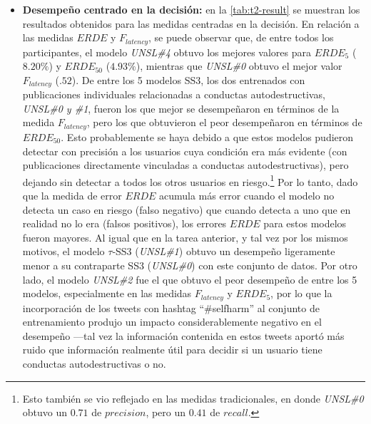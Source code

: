 \begin{itemize}

    

    \item \textbf{Desempeño centrado en la decisión:} en la \autoref{tab:t2-result} se muestran los resultados obtenidos para las medidas centradas en la decisión.
    En relación a las medidas $ERDE$ y $F_{latency}$, se puede observar que, de entre todos los participantes, el modelo \emph{UNSL\#4} obtuvo los mejores valores para $ERDE_5$ ($8.20\%$) y $ERDE_{50}$ ($4.93\%$), mientras que \emph{UNSL\#0} obtuvo el mejor valor $F_{latency}$ ($.52$). %
    De entre los 5 modelos SS3, los dos entrenados con publicaciones individuales relacionadas a conductas autodestructivas, \emph{UNSL\#0 y \#1}, fueron los que mejor se desempeñaron en términos de la medida $F_{latency}$, pero los que obtuvieron el peor desempeñaron en términos de $ERDE_{50}$.
    Esto probablemente se haya debido a que estos modelos pudieron detectar con precisión a los usuarios cuya condición era más evidente (con publicaciones directamente vinculadas a conductas autodestructivas), pero dejando sin detectar a todos los otros usuarios en riesgo.\footnote{Esto también se vio reflejado en las medidas tradicionales, en donde \emph{UNSL\#0} obtuvo un $0.71$ de $precision$, pero un $0.41$ de $recall$.}
    Por lo tanto, dado que la medida de error $ERDE$ acumula más error cuando el modelo no detecta un caso en riesgo (falso negativo) que cuando detecta a uno que en realidad no lo era (falsos positivos), los errores $ERDE$ para estos modelos fueron mayores.
    Al igual que en la tarea anterior, y tal vez por los mismos motivos, el modelo $\tau$-SS3 (\emph{UNSL\#1}) obtuvo un desempeño ligeramente menor a su contraparte SS3 (\emph{UNSL\#0}) con este conjunto de datos.
    Por otro lado, el modelo \emph{UNSL\#2} fue el que obtuvo el peor desempeño de entre los 5 modelos, especialmente en las medidas $F_{latency}$ y $ERDE_5$, por lo que la incorporación de los tweets con hashtag ``\#selfharm'' al conjunto de entrenamiento produjo un impacto considerablemente negativo en el desempeño ---tal vez la información contenida en estos tweets aportó más ruido que información realmente útil para decidir si un usuario tiene conductas autodestructivas o no.

\end{itemize}
